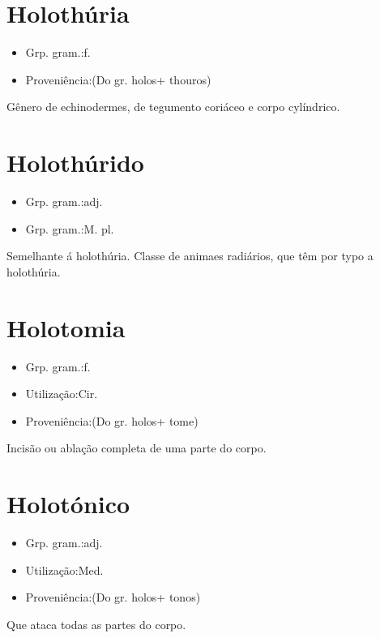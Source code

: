\documentclass{article}
\begin{document}
\section{Holothúria}
\begin{itemize}
\item {Grp. gram.:f.}
\end{itemize}
\begin{itemize}
\item {Proveniência:(Do gr. \textunderscore holos\textunderscore  + \textunderscore thouros\textunderscore )}
\end{itemize}
Gênero de echinodermes, de tegumento coriáceo e corpo cylíndrico.
\section{Holothúrido}
\begin{itemize}
\item {Grp. gram.:adj.}
\end{itemize}
\begin{itemize}
\item {Grp. gram.:M. pl.}
\end{itemize}
Semelhante á holothúria.
Classe de animaes radiários, que têm por typo a holothúria.
\section{Holotomia}
\begin{itemize}
\item {Grp. gram.:f.}
\end{itemize}
\begin{itemize}
\item {Utilização:Cir.}
\end{itemize}
\begin{itemize}
\item {Proveniência:(Do gr. \textunderscore holos\textunderscore  + \textunderscore tome\textunderscore )}
\end{itemize}
Incisão ou ablação completa de uma parte do corpo.
\section{Holotónico}
\begin{itemize}
\item {Grp. gram.:adj.}
\end{itemize}
\begin{itemize}
\item {Utilização:Med.}
\end{itemize}
\begin{itemize}
\item {Proveniência:(Do gr. \textunderscore holos\textunderscore  + \textunderscore tonos\textunderscore )}
\end{itemize}
Que ataca todas as partes do corpo.
\end{document}
